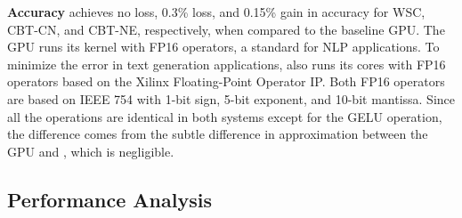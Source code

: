 \textbf{Accuracy}
\sysname{} achieves no loss, 0.3\% loss, and 0.15\% gain in accuracy for WSC, CBT-CN, and CBT-NE, respectively, when compared to the baseline GPU. The GPU runs its kernel with FP16 operators, a standard for NLP applications. To minimize the error in text generation applications, \sysname{} also runs its cores with FP16 operators based on the Xilinx Floating-Point Operator IP. Both FP16 operators are based on IEEE 754 with 1-bit sign, 5-bit exponent, and 10-bit mantissa. Since all the operations are identical in both systems except for the GELU operation, the difference comes from the subtle difference in approximation between the GPU and \sysname{}, which is negligible.








\subsection{Performance Analysis}
\label{performance}


